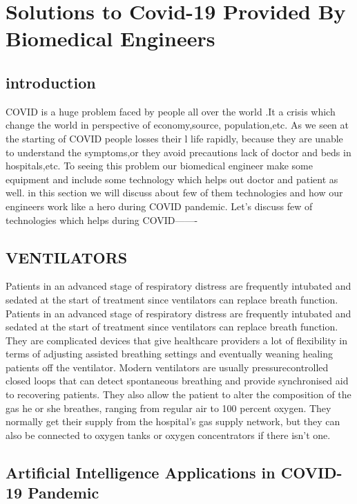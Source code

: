\documentclass{article}
\begin{document}
\section{Solutions to Covid-19 Provided By Biomedical Engineers}

\subsection{introduction}

COVID is a huge problem faced by people all over the world .It a crisis which change the world in perspective of economy,source, population,etc. As we seen at the starting of COVID people losses their l life rapidly, because they are unable to understand the symptoms,or they avoid precautions lack of doctor and beds in hospitals,etc. To seeing this problem our biomedical engineer make some equipment and include some technology which helps out doctor and patient as well. in this section we will discuss about few of them technologies and how our engineers work like a hero during COVID pandemic.
Let’s discuss few of technologies which helps during COVID——-

\subsection{VENTILATORS}

Patients in an advanced stage of respiratory distress are frequently intubated and sedated at the start of treatment since ventilators can replace breath function. Patients in an advanced stage of respiratory distress are frequently intubated and sedated at the start of treatment since ventilators can replace breath function. They are complicated devices that give healthcare providers a lot of flexibility in terms of adjusting assisted breathing settings and eventually weaning healing patients off the ventilator. Modern ventilators are usually pressurecontrolled closed loops that can detect spontaneous breathing and provide synchronised aid to recovering patients. They also allow the patient to alter the composition of the gas he or she breathes, ranging from regular air to 100 percent oxygen. They normally get their supply from the hospital’s gas supply network, but they can also be connected to oxygen tanks or oxygen concentrators if there isn’t one.

\subsection{Artificial Intelligence Applications in COVID-19 Pandemic}
\end{document}
